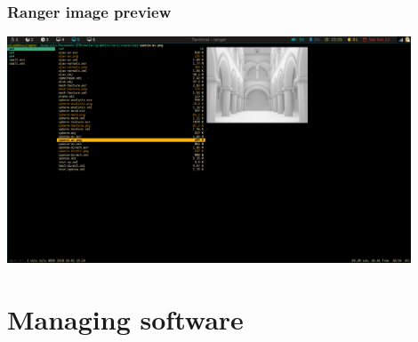 	\begin{frame}[t, fragile]
		\frametitle{Ranger image preview}
		\begin{center}
			\includegraphics[width=0.9\textwidth]{img/ranger_img_preview.png}
		\end{center}
	\end{frame}


    \section{Managing software}

